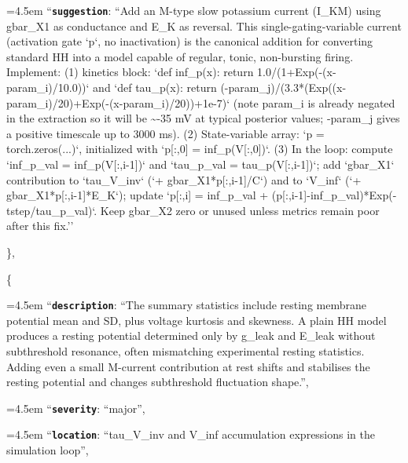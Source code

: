 \begin{tcolorbox}
\par\noindent\hangindent=4.5em \hspace*{3.0em}\hspace*{1.5em}``\textbf{\texttt{suggestion}}\textquotesingle\textquotesingle: ``Add an M-type slow potassium current (I\_KM) using gbar\_X1 as conductance and E\_K as reversal. This single-gating-variable current (activation gate `p`, no inactivation) is the canonical addition for converting standard HH into a model capable of regular, tonic, non-bursting firing. Implement: (1) kinetics block: `def inf\_p(x): return 1.0/(1+Exp(-(x-param\_i)/10.0))` and `def tau\_p(x): return (-param\_j)/(3.3*(Exp((x-param\_i)/20)+Exp(-(x-param\_i)/20))+1e-7)` (note param\_i is already negated in the extraction so it will be \textasciitilde{}-35 mV at typical posterior values; -param\_j gives a positive timescale up to 3000 ms). (2) State-variable array: `p = torch.zeros(...)`, initialized with `p[:,0] = inf\_p(V[:,0])`. (3) In the loop: compute `inf\_p\_val = inf\_p(V[:,i-1])` and `tau\_p\_val = tau\_p(V[:,i-1])`; add `gbar\_X1` contribution to `tau\_V\_inv` (`+ gbar\_X1*p[:,i-1]/C`) and to `V\_inf` (`+ gbar\_X1*p[:,i-1]*E\_K`); update `p[:,i] = inf\_p\_val + (p[:,i-1]-inf\_p\_val)*Exp(-tstep/tau\_p\_val)`. Keep gbar\_X2 zero or unused unless metrics remain poor after this fix.''
\par\noindent \hspace*{3.0em}\},
\par\noindent \hspace*{3.0em}\{
\par\noindent\hangindent=4.5em \hspace*{3.0em}\hspace*{1.5em}``\textbf{\texttt{description}}\textquotesingle\textquotesingle: ``The summary statistics include resting membrane potential mean and SD, plus voltage kurtosis and skewness. A plain HH model produces a resting potential determined only by g\_leak and E\_leak without subthreshold resonance, often mismatching experimental resting statistics. Adding even a small M-current contribution at rest shifts and stabilises the resting potential and changes subthreshold fluctuation shape.'',
\par\noindent\hangindent=4.5em \hspace*{3.0em}\hspace*{1.5em}``\textbf{\texttt{severity}}\textquotesingle\textquotesingle: ``major'',
\par\noindent\hangindent=4.5em \hspace*{3.0em}\hspace*{1.5em}``\textbf{\texttt{location}}\textquotesingle\textquotesingle: ``tau\_V\_inv and V\_inf accumulation expressions in the simulation loop'',

\end{tcolorbox}
